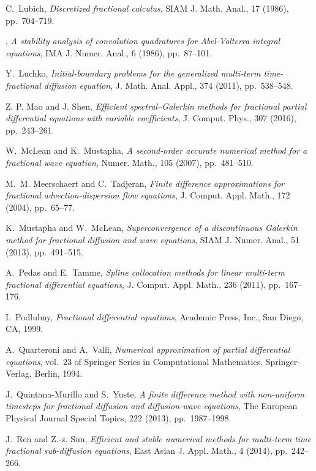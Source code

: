 \documentclass[10pt]{siamltex}
\begin{document}
\begin{thebibliography}{10}
{\sc C.~Lubich}, {\em Discretized fractional calculus}, SIAM J. Math. Anal., 17
  (1986), pp.~704--719.

\leavevmode\vrule height 2pt depth -1.6pt width 23pt, {\em A stability analysis
  of convolution quadratures for {A}bel-{V}olterra integral equations}, IMA J.
  Numer. Anal., 6 (1986), pp.~87--101.

{\sc Y.~Luchko}, {\em Initial-boundary problems for the generalized multi-term
  time-fractional diffusion equation}, J. Math. Anal. Appl., 374 (2011),
  pp.~538--548.


{\sc Z. P. Mao and J. Shen}, {\em Efficient spectral--{G}alerkin methods for fractional partial
differential equations with variable coefficients}, J. Comput. Phys., 307 (2016), pp.~243--261.


{\sc W.~McLean and K.~Mustapha}, {\em A second-order accurate numerical method
  for a fractional wave equation}, Numer. Math., 105 (2007), pp.~481--510.

{\sc M.~M. Meerschaert and C.~Tadjeran}, {\em Finite difference approximations
  for fractional advection-dispersion flow equations}, J. Comput. Appl. Math.,
  172 (2004), pp.~65--77.

{\sc K.~Mustapha and W.~McLean}, {\em Superconvergence of a discontinuous
  {G}alerkin method for fractional diffusion and wave equations}, SIAM J.
  Numer. Anal., 51 (2013), pp.~491--515.

{\sc A.~Pedas and E.~Tamme}, {\em Spline collocation methods for linear
  multi-term fractional differential equations}, J. Comput. Appl. Math., 236
  (2011), pp.~167--176.

{\sc I.~Podlubny}, {\em Fractional differential equations}, Academic Press,
  Inc., San Diego, CA, 1999.

{\sc A.~Quarteroni and A.~Valli}, {\em Numerical approximation of partial
  differential equations}, vol.~23 of Springer Series in Computational
  Mathematics, Springer-Verlag, Berlin, 1994.

{\sc J.~Quintana-Murillo and S.~Yuste}, {\em A finite difference method with
  non-uniform timesteps for fractional diffusion and diffusion-wave equations},
  The European Physical Journal Special Topics, 222 (2013), pp.~1987--1998.

{\sc J.~Ren and Z.-z. Sun}, {\em Efficient and stable numerical methods for
  multi-term time fractional sub-diffusion equations}, East Asian J. Appl.
  Math., 4 (2014), pp.~242--266.


\end{thebibliography}
\end{document}

